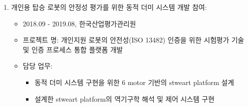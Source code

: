 \documentclass[a4paper,10pt]{article}
\begin{document}
{\begin{enumerate}
\begin{itemize}
\begin{itemize}
                    \item 근력 증강 로봇의 제어를 위한 생체 신호(sEMG) 및 물리 센서의 회로 및 상보필터 개발
                    \item 근력증강로봇 제어를 위한 피부부착형 다중 센서 중, 증폭된 EMG 신호 회로와 24bit A/D Converter칩 간의 회로 구성
                    \item 24bit A/DC과 마이크로프로세서(MCU) 간의 SPI 통신 회로 구성 및 프로토콜 분석
                    \item 설계된 아날로그 회로의 PCB 설계
                \end{itemize}
        \end{itemize}
        \item 개인용 탑승 로봇의 안정성 평가를 위한 동적 더미 시스템 개발 참여:
        \begin{itemize}
            \item 2018.09 - 2019.08, 한국산업평가관리원
            \item 프로젝트 명: 개인지원 로봇의 안전성(ISO 13482) 인증을 위한 시험평가 기술 및 인증 프로세스 통합 플랫폼 개발
            \item 담당 업무:
                \begin{itemize}
                    \item 동적 더미 시스템 구현을 위한 6 motor 기반의 stweart platform 설계
                    \item 설계한 stweart platform의 역기구학 해석 및 제어 시스템 구현
                \end{itemize}
        \end{itemize}
        

\end{enumerate}}
\end{document}
